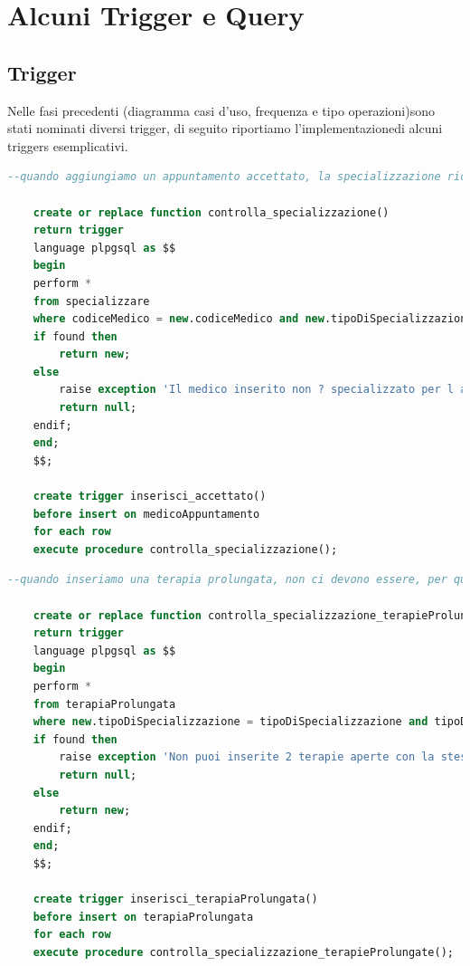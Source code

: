 \documentclass[11pt]{article}
\begin{document}
\section{Alcuni Trigger e Query}
\subsection{Trigger}
Nelle fasi precedenti (diagramma casi d'uso, frequenza e tipo operazioni)sono stati nominati diversi trigger, di seguito riportiamo l'implementazionedi alcuni triggers esemplicativi.
\\
\label{trig:trigger1}
\begin{lstlisting}[language=SQL]
    --quando aggiungiamo un appuntamento accettato, la specializzazione richiesta dalla terapia deve essere tra le specializzazioni del medico che fa l'appuntamento

    create or replace function controlla_specializzazione()
    return trigger
    language plpgsql as $$
    begin
    perform *
    from specializzare
    where codiceMedico = new.codiceMedico and new.tipoDiSpecializzazione = tipoDiSpecializzazione;
    if found then
        return new;
    else
        raise exception 'Il medico inserito non ? specializzato per l appuntamento';
        return null;
    endif;
    end;
    $$;
    
    create trigger inserisci_accettato()
    before insert on medicoAppuntamento
    for each row
    execute procedure controlla_specializzazione();
\end{lstlisting}
\begin{lstlisting}[language=SQL]
    --quando inseriamo una terapia prolungata, non ci devono essere, per quel paziente, terapie prolungate aperte con lo stesso tipo di specializzazione

    create or replace function controlla_specializzazione_terapieProlungate()
    return trigger
    language plpgsql as $$
    begin
    perform *
    from terapiaProlungata
    where new.tipoDiSpecializzazione = tipoDiSpecializzazione and tipoDiTerapia = 'aperta' and new.cf = cf and new.tipoDiTerapia = 'aperto';
    if found then
        raise exception 'Non puoi inserite 2 terapie aperte con la stessa specializzazione';
        return null;
    else
        return new;
    endif;
    end;
    $$;
    
    create trigger inserisci_terapiaProlungata()
    before insert on terapiaProlungata
    for each row
    execute procedure controlla_specializzazione_terapieProlungate();
\end{lstlisting}
\end{document}
